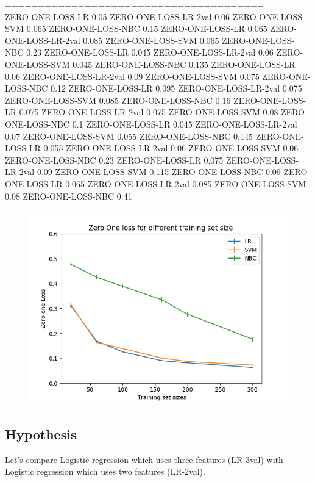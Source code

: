 \documentclass[12pt]{article}
\begin{document}
=======================================\\

ZERO-ONE-LOSS-LR 0.05
ZERO-ONE-LOSS-LR-2val 0.06
ZERO-ONE-LOSS-SVM 0.065
ZERO-ONE-LOSS-NBC 0.15
ZERO-ONE-LOSS-LR 0.065
ZERO-ONE-LOSS-LR-2val 0.085
ZERO-ONE-LOSS-SVM 0.065
ZERO-ONE-LOSS-NBC 0.23
ZERO-ONE-LOSS-LR 0.045
ZERO-ONE-LOSS-LR-2val 0.06
ZERO-ONE-LOSS-SVM 0.045
ZERO-ONE-LOSS-NBC 0.135
ZERO-ONE-LOSS-LR 0.06
ZERO-ONE-LOSS-LR-2val 0.09
ZERO-ONE-LOSS-SVM 0.075
ZERO-ONE-LOSS-NBC 0.12
ZERO-ONE-LOSS-LR 0.095
ZERO-ONE-LOSS-LR-2val 0.075
ZERO-ONE-LOSS-SVM 0.085
ZERO-ONE-LOSS-NBC 0.16
ZERO-ONE-LOSS-LR 0.075
ZERO-ONE-LOSS-LR-2val 0.075
ZERO-ONE-LOSS-SVM 0.08
ZERO-ONE-LOSS-NBC 0.1
ZERO-ONE-LOSS-LR 0.045
ZERO-ONE-LOSS-LR-2val 0.07
ZERO-ONE-LOSS-SVM 0.055
ZERO-ONE-LOSS-NBC 0.145
ZERO-ONE-LOSS-LR 0.055
ZERO-ONE-LOSS-LR-2val 0.06
ZERO-ONE-LOSS-SVM 0.06
ZERO-ONE-LOSS-NBC 0.23
ZERO-ONE-LOSS-LR 0.075
ZERO-ONE-LOSS-LR-2val 0.09
ZERO-ONE-LOSS-SVM 0.115
ZERO-ONE-LOSS-NBC 0.09
ZERO-ONE-LOSS-LR 0.065
ZERO-ONE-LOSS-LR-2val 0.085
ZERO-ONE-LOSS-SVM 0.08
ZERO-ONE-LOSS-NBC 0.41\\



\begin{figure}
	\centering
	\includegraphics{AllModelsThreeFeats.png}
\end{figure}

\subsection{Hypothesis}

Let's compare Logistic regression which uses three features (LR-3val) with
 Logistic regression which uses two features (LR-2val).
\end{document}
